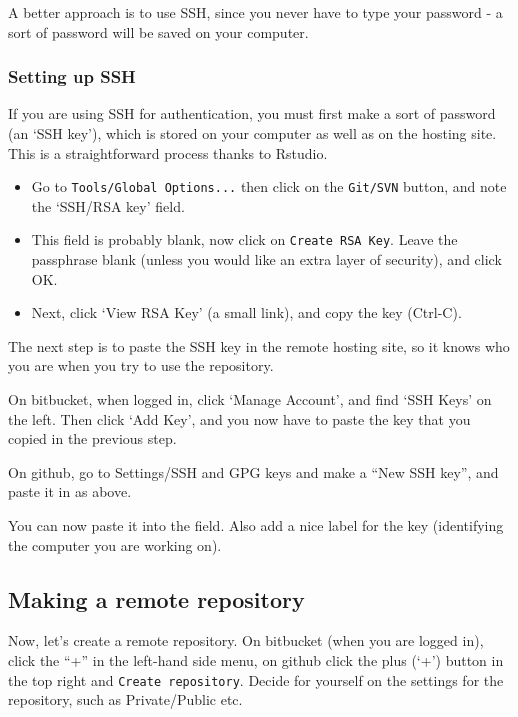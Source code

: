 \documentclass[]{book}
\providecommand{\tightlist}{%
  \setlength{\itemsep}{0pt}\setlength{\parskip}{0pt}}
\begin{document}
A better approach is to use SSH, since you never have to type your password - a sort of password will be saved on your computer.

\hypertarget{setting-up-ssh}{%
\subsubsection{Setting up SSH}\label{setting-up-ssh}}

If you are using SSH for authentication, you must first make a sort of password (an `SSH key'), which is stored on your computer as well as on the hosting site. This is a straightforward process thanks to Rstudio.

\begin{itemize}
\tightlist
\item
  Go to \texttt{Tools/Global\ Options...} then click on the \texttt{Git/SVN} button, and note the `SSH/RSA key' field.
\item
  This field is probably blank, now click on \texttt{Create\ RSA\ Key}. Leave the passphrase blank (unless you would like an extra layer of security), and click OK.
\item
  Next, click `View RSA Key' (a small link), and copy the key (Ctrl-C).
\end{itemize}

The next step is to paste the SSH key in the remote hosting site, so it knows who you are when you try to use the repository.

On bitbucket, when logged in, click `Manage Account', and find `SSH Keys' on the left. Then click `Add Key', and you now have to paste the key that you copied in the previous step.

On github, go to Settings/SSH and GPG keys and make a ``New SSH key'', and paste it in as above.

You can now paste it into the field. Also add a nice label for the key (identifying the computer you are working on).

\hypertarget{makeremotegit}{%
\subsection{Making a remote repository}\label{makeremotegit}}

Now, let's create a remote repository. On bitbucket (when you are logged in), click the ``+'' in the left-hand side menu, on github click the plus (`+') button in the top right and \texttt{Create\ repository}. Decide for yourself on the settings for the repository, such as Private/Public etc.
\end{document}
